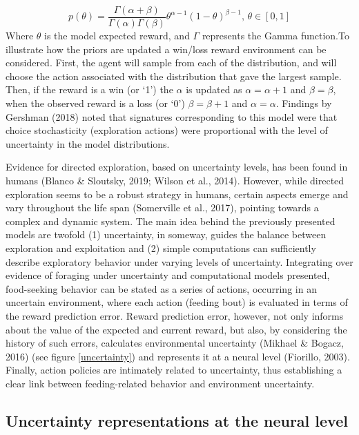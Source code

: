 \documentclass[
]{/home/nicoluarte/Downloads/templates/PNAS-template-main.tex}
\begin{document}
\[p(\theta) = \frac{\Gamma(\alpha + \beta)}{\Gamma(\alpha)\Gamma(\beta)}\theta^{\alpha-1}(1-\theta)^{\beta-1}, \, \theta \in [0, 1]\]
Where \(\theta\) is the model expected reward, and \(\Gamma\) represents
the Gamma function.To illustrate how the priors are updated a win/loss
reward environment can be considered. First, the agent will sample from
each of the distribution, and will choose the action associated with the
distribution that gave the largest sample. Then, if the reward is a win
(or `1') the \(\alpha\) is updated as \(\alpha = \alpha + 1\) and
\(\beta = \beta\), when the observed reward is a loss (or `0')
\(\beta = \beta + 1\) and \(\alpha = \alpha\). Findings by Gershman
(2018) noted that signatures corresponding to this model were that
choice stochasticity (exploration actions) were proportional with the
level of uncertainty in the model distributions.

Evidence for directed exploration, based on uncertainty levels, has been
found in humans (Blanco \& Sloutsky, 2019; Wilson et al., 2014).
However, while directed exploration seems to be a robust strategy in
humans, certain aspects emerge and vary throughout the life span
(Somerville et al., 2017), pointing towards a complex and dynamic
system. The main idea behind the previously presented models are twofold
(1) uncertainty, in someway, guides the balance between exploration and
exploitation and (2) simple computations can sufficiently describe
exploratory behavior under varying levels of uncertainty. Integrating
over evidence of foraging under uncertainty and computational models
presented, food-seeking behavior can be stated as a series of actions,
occurring in an uncertain environment, where each action (feeding bout)
is evaluated in terms of the reward prediction error. Reward prediction
error, however, not only informs about the value of the expected and
current reward, but also, by considering the history of such errors,
calculates environmental uncertainty (Mikhael \& Bogacz, 2016) (see
figure \ref{uncertainty}) and represents it at a neural level (Fiorillo,
2003). Finally, action policies are intimately related to uncertainty,
thus establishing a clear link between feeding-related behavior and
environment uncertainty.

\hypertarget{uncertainty-representations-at-the-neural-level}{%
\subsection{Uncertainty representations at the neural
level}\label{uncertainty-representations-at-the-neural-level}}
\end{document}
